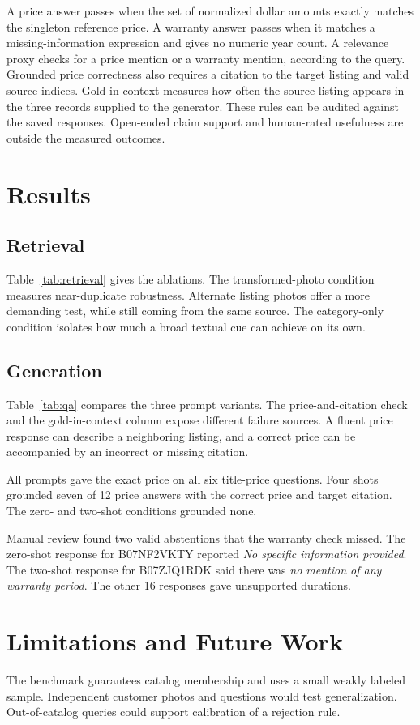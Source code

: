 \documentclass{article}
\begin{document}
A price answer passes when the set of normalized dollar amounts exactly matches the singleton reference price. A warranty answer passes when it matches a missing-information expression and gives no numeric year count. A relevance proxy checks for a price mention or a warranty mention, according to the query. Grounded price correctness also requires a citation to the target listing and valid source indices. Gold-in-context measures how often the source listing appears in the three records supplied to the generator. These rules can be audited against the saved responses. Open-ended claim support and human-rated usefulness are outside the measured outcomes.

\section{Results}
\subsection{Retrieval}
Table~\ref{tab:retrieval} gives the ablations. \RetrievalDiscussion{} The transformed-photo condition measures near-duplicate robustness. Alternate listing photos offer a more demanding test, while still coming from the same source. The category-only condition isolates how much a broad textual cue can achieve on its own.

\subsection{Generation}
Table~\ref{tab:qa} compares the three prompt variants. \QADiscussion{} The price-and-citation check and the gold-in-context column expose different failure sources. A fluent price response can describe a neighboring listing, and a correct price can be accompanied by an incorrect or missing citation.
\CaseDiscussion

All prompts gave the exact price on all six title-price questions. Four shots grounded seven of 12 price answers with the correct price and target citation. The zero- and two-shot conditions grounded none.

Manual review found two valid abstentions that the warranty check missed. The zero-shot response for B07NF2VKTY reported \emph{No specific information provided}. The two-shot response for B07ZJQ1RDK said there was \emph{no mention of any warranty period}. The other 16 responses gave unsupported durations.

\section{Limitations and Future Work}
The benchmark guarantees catalog membership and uses a small weakly labeled sample. Independent customer photos and questions would test generalization. Out-of-catalog queries could support calibration of a rejection rule.
\end{document}
